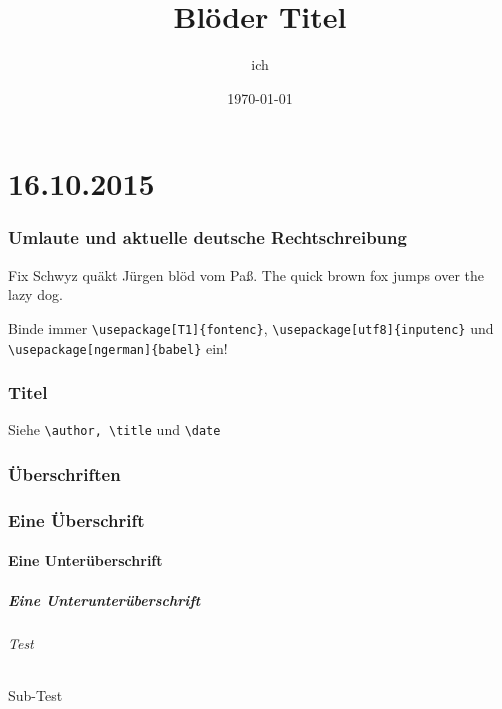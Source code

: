 \documentclass[a4paper]{article}
\title{Blöder Titel}
\author{ich}
\date{\today}
\begin{document}
\part{16.10.2015}
\section{Umlaute und aktuelle deutsche Rechtschreibung}
Fix Schwyz quäkt Jürgen blöd vom Paß.
The quick brown fox jumps over the lazy dog.

Binde immer \verb+\usepackage[T1]{fontenc}+, \verb+\usepackage[utf8]{inputenc}+ und \verb+\usepackage[ngerman]{babel}+ ein!

\section{Titel}
\maketitle %

Siehe \verb+\author, \title+ und \verb+\date+

\section{Überschriften}

\section{Eine Überschrift}
\subsection{Eine Unterüberschrift}
\subsubsection{Eine Unterunterüberschrift}
\paragraph{Test}
\subparagraph{Sub-Test}

\tableofcontents
\end{document}
